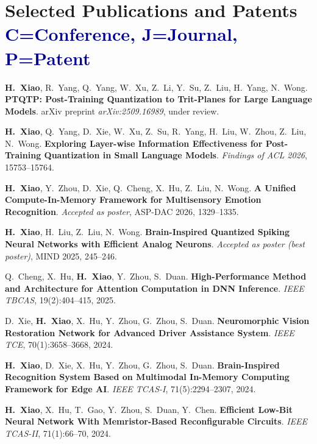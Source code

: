 \documentclass[a4paper,11pt]{article}
\begin{document}
\section{\textbf{Selected Publications and Patents} \hfill \textcolor{darkblue}{\scriptsize C=Conference, J=Journal, P=Patent}}
\vspace{0.2mm}
\small{
\begin{enumerate}[leftmargin=*, labelsep=0.5em, align=left, widest={\textbf{[P.3]}}, itemindent=0em]
\item[\textbf{[C.1]}] \textbf{H.~Xiao}, R.~Yang, Q.~Yang, W.~Xu, Z.~Li, Y.~Su, Z.~Liu, H.~Yang, N.~Wong. \textbf{PTQTP: Post-Training Quantization to Trit-Planes for Large Language Models}. arXiv preprint \textit{arXiv:2509.16989}, under review.
\item[\textbf{[C.2]}] \textbf{H.~Xiao}, Q.~Yang, D.~Xie, W.~Xu, Z.~Su, R.~Yang, H.~Liu, W.~Zhou, Z.~Liu, N.~Wong. \textbf{Exploring Layer-wise Information Effectiveness for Post-Training Quantization in Small Language Models}. \textit{Findings of ACL 2026}, 15753--15764.
\item[\textbf{[C.3]}] \textbf{H.~Xiao}, Y.~Zhou, D.~Xie, Q.~Cheng, X.~Hu, Z.~Liu, N.~Wong. \textbf{A Unified Compute-In-Memory Framework for Multisensory Emotion Recognition}. \textit{Accepted as poster}, ASP-DAC 2026, 1329--1335.
\item[\textbf{[C.4]}] \textbf{H.~Xiao}, H.~Liu, Z.~Liu, N.~Wong. \textbf{Brain-Inspired Quantized Spiking Neural Networks with Efficient Analog Neurons}. \textit{Accepted as poster (best poster)}, MIND 2025, 245--246.
\item[\textbf{[J.1]}] Q.~Cheng, X.~Hu, \textbf{H.~Xiao}, Y.~Zhou, S.~Duan. \textbf{High-Performance Method and Architecture for Attention Computation in DNN Inference}. \textit{IEEE TBCAS}, 19(2):404--415, 2025.
\item[\textbf{[J.2]}] D.~Xie, \textbf{H.~Xiao}, X.~Hu, Y.~Zhou, G.~Zhou, S.~Duan. \textbf{Neuromorphic Vision Restoration Network for Advanced Driver Assistance System}. \textit{IEEE TCE}, 70(1):3658--3668, 2024.
\item[\textbf{[J.3]}] \textbf{H.~Xiao}, D.~Xie, X.~Hu, Y.~Zhou, G.~Zhou, S.~Duan. \textbf{Brain-Inspired Recognition System Based on Multimodal In-Memory Computing Framework for Edge AI}. \textit{IEEE TCAS-I}, 71(5):2294--2307, 2024.
\item[\textbf{[J.4]}] \textbf{H.~Xiao}, X.~Hu, T.~Gao, Y.~Zhou, S.~Duan, Y.~Chen. \textbf{Efficient Low-Bit Neural Network With Memristor-Based Reconfigurable Circuits}. \textit{IEEE TCAS-II}, 71(1):66--70, 2024.

\end{enumerate}}
\end{document}
